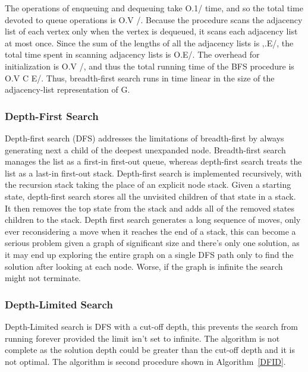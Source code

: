 \documentclass[final]{cmpreport}
\begin{document}
The operations of enqueuing and dequeuing take O.1/ time, and so the total time devoted to queue
operations is O.V /. Because the procedure scans the adjacency list of each vertex
only when the vertex is dequeued, it scans each adjacency list at most once. Since
the sum of the lengths of all the adjacency lists is ‚.E/, the total time spent in
scanning adjacency lists is O.E/. The overhead for initialization is O.V /, and
thus the total running time of the BFS procedure is O.V C E/. Thus, breadth-first
search runs in time linear in the size of the adjacency-list representation of G.


\subsubsection{Depth-First Search}
Depth-first search (DFS) addresses the limitations of breadth-first by always generating next a child of the deepest unexpanded node. Breadth-first search manages the list as a first-in first-out queue, whereas depth-first search treats the list as a last-in first-out stack. Depth-first search is implemented recursively, with the recursion stack taking the place of an explicit node stack. Given a starting state, depth-first search stores all the unvisited children of that state in a stack. It then removes the top state from the stack and adds all of the removed states children to the stack. Depth first search generates a long sequence of moves, only ever reconsidering a move when it reaches the end of a stack, this can become a serious problem given a graph of significant size and there's only one solution, as it may end up exploring the entire graph on a single DFS path only to find the solution after looking at each node. Worse, if the graph is infinite the search might not terminate.



\subsubsection{Depth-Limited Search}
Depth-Limited search is DFS with a cut-off depth, this prevents the search from running forever provided the limit isn't set to infinite. The algorithm is not complete as the solution depth could be greater than the cut-off depth and it is not optimal. The algorithm is second procedure shown in Algorithm~\ref{DFID}.


  
\end{document}
